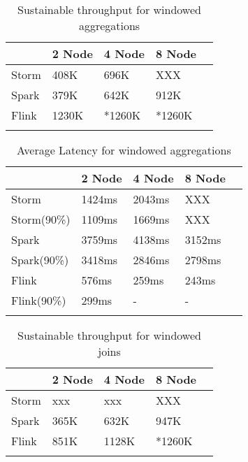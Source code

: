     \begin{table}
        \begin{tabular}{lllll}\toprule
            &\textbf{2 Node}  & \textbf{4 Node} & \textbf{8 Node}\\\midrule
            Storm & 408K & 696K & XXX  \\
            Spark & 379K & 642K & 912K  \\
            Flink & 1230K & *1260K & *1260K \\
            \\\bottomrule
        \end{tabular}
        \caption{Sustainable throughput for windowed aggregations}\label{Tab1}
    \end{table} 



    \begin{table}
        \begin{tabular}{lllll}\toprule
            &\textbf{2 Node}  & \textbf{4 Node} & \textbf{8 Node}\\\midrule
            Storm & 1424ms & 2043ms & XXX \\
            Storm(90\%) & 1109ms & 1669ms & XXX \\
            Spark & 3759ms & 4138ms & 3152ms\\
            Spark(90\%) & 3418ms & 2846ms & 2798ms\\
            Flink & 576ms & 259ms & 243ms \\
            Flink(90\%) & 299ms & -  & - \\
            \\\bottomrule
        \end{tabular}
        \caption{Average Latency for windowed aggregations}\label{Tab1}
    \end{table} 


    \begin{table}
        \begin{tabular}{lllll}\toprule
            &\textbf{2 Node}  & \textbf{4 Node} & \textbf{8 Node}\\\midrule
            Storm & xxx & xxx & XXX  \\
            Spark & 365K & 632K & 947K  \\
            Flink & 851K & 1128K & *1260K \\
            \\\bottomrule
        \end{tabular}
        \caption{Sustainable throughput for windowed joins}\label{Tab1}
    \end{table} 



